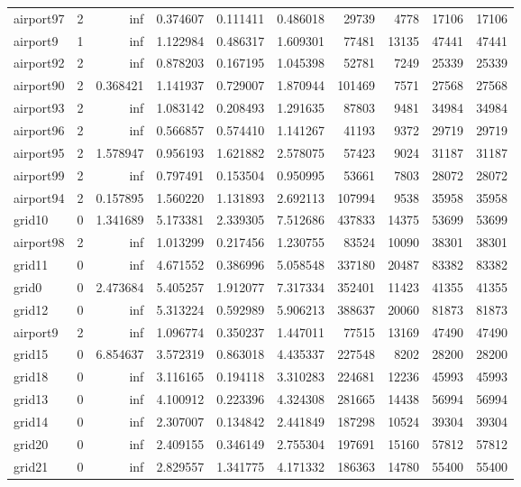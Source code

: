 \begin{longtable}{|l|r|r|r|r|r|r|r|r|r|}
airport97 & 2 & inf & 0.374607 & 0.111411 & 0.486018 & 29739 & 4778 & 17106 & 17106 \\
airport9 & 1 & inf & 1.122984 & 0.486317 & 1.609301 & 77481 & 13135 & 47441 & 47441 \\
airport92 & 2 & inf & 0.878203 & 0.167195 & 1.045398 & 52781 & 7249 & 25339 & 25339 \\
airport90 & 2 & 0.368421 & 1.141937 & 0.729007 & 1.870944 & 101469 & 7571 & 27568 & 27568 \\
airport93 & 2 & inf & 1.083142 & 0.208493 & 1.291635 & 87803 & 9481 & 34984 & 34984 \\
airport96 & 2 & inf & 0.566857 & 0.574410 & 1.141267 & 41193 & 9372 & 29719 & 29719 \\
airport95 & 2 & 1.578947 & 0.956193 & 1.621882 & 2.578075 & 57423 & 9024 & 31187 & 31187 \\
airport99 & 2 & inf & 0.797491 & 0.153504 & 0.950995 & 53661 & 7803 & 28072 & 28072 \\
airport94 & 2 & 0.157895 & 1.560220 & 1.131893 & 2.692113 & 107994 & 9538 & 35958 & 35958 \\
grid10 & 0 & 1.341689 & 5.173381 & 2.339305 & 7.512686 & 437833 & 14375 & 53699 & 53699 \\
airport98 & 2 & inf & 1.013299 & 0.217456 & 1.230755 & 83524 & 10090 & 38301 & 38301 \\
grid11 & 0 & inf & 4.671552 & 0.386996 & 5.058548 & 337180 & 20487 & 83382 & 83382 \\
grid0 & 0 & 2.473684 & 5.405257 & 1.912077 & 7.317334 & 352401 & 11423 & 41355 & 41355 \\
grid12 & 0 & inf & 5.313224 & 0.592989 & 5.906213 & 388637 & 20060 & 81873 & 81873 \\
airport9 & 2 & inf & 1.096774 & 0.350237 & 1.447011 & 77515 & 13169 & 47490 & 47490 \\
grid15 & 0 & 6.854637 & 3.572319 & 0.863018 & 4.435337 & 227548 & 8202 & 28200 & 28200 \\
grid18 & 0 & inf & 3.116165 & 0.194118 & 3.310283 & 224681 & 12236 & 45993 & 45993 \\
grid13 & 0 & inf & 4.100912 & 0.223396 & 4.324308 & 281665 & 14438 & 56994 & 56994 \\
grid14 & 0 & inf & 2.307007 & 0.134842 & 2.441849 & 187298 & 10524 & 39304 & 39304 \\
grid20 & 0 & inf & 2.409155 & 0.346149 & 2.755304 & 197691 & 15160 & 57812 & 57812 \\
grid21 & 0 & inf & 2.829557 & 1.341775 & 4.171332 & 186363 & 14780 & 55400 & 55400 \\

\end{longtable}
